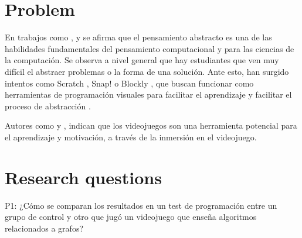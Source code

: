 \documentclass[submission]{eptcs}
\begin{document}



\section{Problem}

En trabajos como \cite{abstract_thinking_cs}, \cite{fundamentals_software_abstract} y \cite{wingresearch_abstract}
se afirma que el pensamiento abstracto es una de las habilidades fundamentales del pensamiento computacional
y para las ciencias de la computación. Se observa a nivel general que hay estudiantes que ven muy difícil
el abstraer problemas o la forma de una solución. Ante esto, han surgido intentos como Scratch \cite{scratch}, Snap! o 
Blockly \cite{Blockly}, que buscan funcionar como herramientas de programación visuales para facilitar
el aprendizaje y facilitar el proceso de abstracción \cite{programming_education}.

Autores como \cite{games_makes_us_better} y \cite{barab2009transformational}, indican que los videojuegos son
una herramienta potencial para el aprendizaje y motivación, a través de la inmersión en el videojuego. 


\section{Research questions}

P1: ¿Cómo se comparan los resultados en un test de programación entre un grupo de control y otro que
jugó un videojuego que enseña algoritmos relacionados a grafos?
\end{document}

